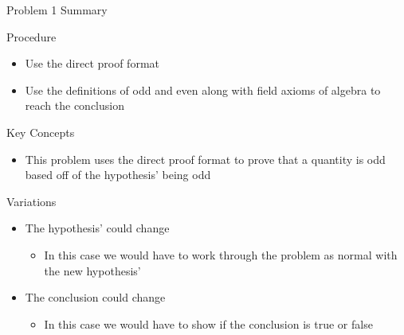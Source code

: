 \begin{summary}{Problem 1 Summary}
    \begin{statement}{Procedure}
        \begin{itemize}
            \item Use the direct proof format
            \item Use the definitions of odd and even along with field axioms of algebra to reach the conclusion
        \end{itemize}
    \end{statement}
    \begin{statement}{Key Concepts}
        \begin{itemize}
            \item This problem uses the direct proof format to prove that a quantity is odd based off of the hypothesis' being odd
        \end{itemize}
    \end{statement}
    \begin{statement}{Variations}
        \begin{itemize}
            \item The hypothesis' could change
            \begin{itemize}
                \item In this case we would have to work through the problem as normal with the new hypothesis'
            \end{itemize}
            \item The conclusion could change
            \begin{itemize}
                \item In this case we would have to show if the conclusion is true or false
            \end{itemize}
        \end{itemize}
    \end{statement}
\end{summary}

